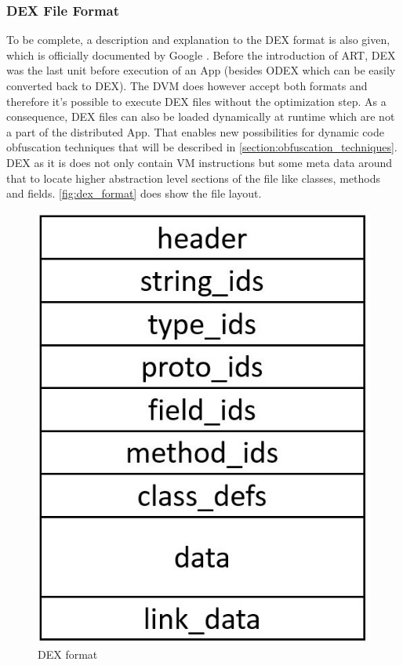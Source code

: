 \subsubsection{DEX File Format}
\label{section:dex_file_format}
To be complete, a description and explanation to the DEX format is also given,
which is officially documented by Google \parencite{dex}.
Before the introduction of ART, DEX was the last unit before
execution of an App (besides ODEX which can be easily converted back to DEX). The DVM does however accept both formats and therefore it's possible to execute
DEX files without the optimization step. As a consequence,
DEX files can also be loaded dynamically at runtime which are not a part
of the distributed App. That enables new possibilities for dynamic code obfuscation techniques that will be described in \autoref{section:obfuscation_techniques}. DEX as it is does not only contain
VM instructions but some meta data around that to locate
higher abstraction level sections of the file like classes,
methods and fields.
\autoref{fig:dex_format} does show the file layout.
\begin{figure}[htb]
  \centering
  \includegraphics[scale=0.3]{figures/dex_format}
  \caption[DEX format]{DEX format}
  \label{fig:dex_format}
\end{figure}
